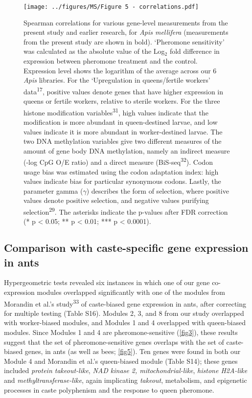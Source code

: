 \documentclass[12pt,]{article}
\begin{document}
\begin{figure}
\centering
\texttt{[image: ../figures/MS/Figure 5 - correlations.pdf]}
\caption{\footnotesize Spearman correlations for various gene-level
measurements from the present study and earlier research, for \emph{Apis
mellifera} (measurements from the present study are shown in bold).
`Pheromone sensitivity' was calculated as the absolute value of the
Log\(_2\) fold difference in expression between pheromone treatment and
the control. Expression level shows the logarithm of the average across
our 6 \emph{Apis} libraries. For the `Upregulation in queens/fertile
workers' data\textsuperscript{17}, positive values denote genes that
have higher expression in queens or fertile workers, relative to sterile
workers. For the three histone modification
variables\textsuperscript{31}, high values indicate that the
modification is more abundant in queen-destined larvae, and low values
indicate it is more abundant in worker-destined larvae. The two DNA
methylation variables give two different measures of the amount of gene
body DNA methylation, namely an indirect measure (-log CpG O/E ratio)
and a direct measure (BiS-seq\textsuperscript{32}). Codon usage bias was
estimated using the codon adaptation index: high values indicate bias
for particular synonymous codons. Lastly, the parameter gamma
(\(\gamma\)) describes the form of selection, where positive values
denote positive selection, and negative values purifying
selection\textsuperscript{29}. The asterisks indicate the p-values after
FDR correction (* p \textless{} 0.05; ** p \textless{} 0.01; *** p
\textless{} 0.0001). \label{fig5}}
\end{figure}

\subsection{Comparison with caste-specific gene expression in
ants}\label{comparison-with-caste-specific-gene-expression-in-ants}

Hypergeometric tests revealed six instances in which one of our gene
co-expression modules overlapped significantly with one of the modules
from Morandin et al.'s study\textsuperscript{33} of caste-biased gene
expression in ants, after correcting for multiple testing (Table S16).
Modules 2, 3, and 8 from our study overlapped with worker-biased
modules, and Modules 1 and 4 overlapped with queen-biased modules. Since
Modules 1 and 4 are pheromone-sensitive (\autoref{fig3}), these results
suggest that the set of pheromone-sensitive genes overlaps with the set
of caste-biased genes, in ants (as well as bees; \autoref{fig5}). Ten
genes were found in both our Module 4 and Morandin et al.'s queen-biased
module (Table S14); these genes included \emph{protein takeout-like},
\emph{NAD kinase 2, mitochondrial-like}, \emph{histone H2A-like} and
\emph{methyltransferase-like}, again implicating \emph{takeout},
metabolism, and epigenetic processes in caste polyphenism and the
response to queen pheromone.
\end{document}
